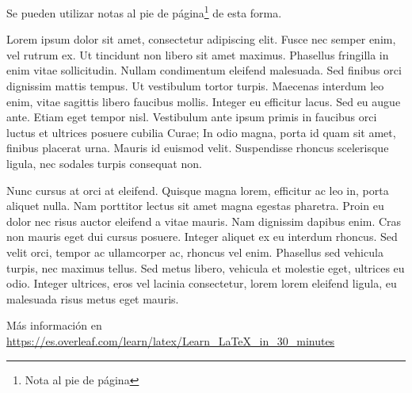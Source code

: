 Se pueden utilizar notas al pie de página\footnote{Nota al pie de página} de esta forma.


Lorem ipsum dolor sit amet, consectetur adipiscing elit. Fusce nec semper enim, vel rutrum ex. Ut tincidunt non libero sit amet maximus. Phasellus fringilla in enim vitae sollicitudin. Nullam condimentum eleifend malesuada. Sed finibus orci dignissim mattis tempus. Ut vestibulum tortor turpis. Maecenas interdum leo enim, vitae sagittis libero faucibus mollis. Integer eu efficitur lacus. Sed eu augue ante. Etiam eget tempor nisl. Vestibulum ante ipsum primis in faucibus orci luctus et ultrices posuere cubilia Curae; In odio magna, porta id quam sit amet, finibus placerat urna. Mauris id euismod velit. Suspendisse rhoncus scelerisque ligula, nec sodales turpis consequat non.

Nunc cursus at orci at eleifend. Quisque magna lorem, efficitur ac leo in, porta aliquet nulla. Nam porttitor lectus sit amet magna egestas pharetra. Proin eu dolor nec risus auctor eleifend a vitae mauris. Nam dignissim dapibus enim. Cras non mauris eget dui cursus posuere. Integer aliquet ex eu interdum rhoncus. Sed velit orci, tempor ac ullamcorper ac, rhoncus vel enim. Phasellus sed vehicula turpis, nec maximus tellus. Sed metus libero, vehicula et molestie eget, ultrices eu odio. Integer ultrices, eros vel lacinia consectetur, lorem lorem eleifend ligula, eu malesuada risus metus eget mauris.

Más información en \url{https://es.overleaf.com/learn/latex/Learn_LaTeX_in_30_minutes}
